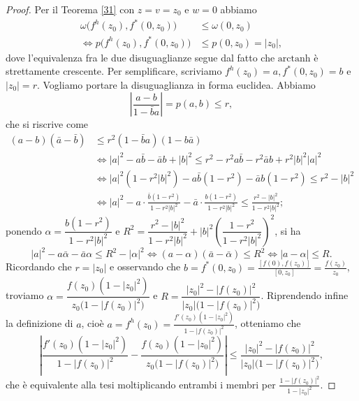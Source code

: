 \begin{proof}
  Per il Teorema \ref{31} con $z=v=z_0$ e $w=0$ abbiamo
  \begin{align*}
    \omega\bigl(f^h(z_0),f^*(0,z_0)\bigr) & \le \omega(0,z_0) \\
    \iff p\bigl(f^h(z_0),f^*(0,z_0)\bigr) & \le p(0,z_0)=|z_0|,
  \end{align*}
  dove l'equivalenza fra le due disuguaglianze segue dal fatto che $\text{arctanh}$ è strettamente crescente. Per semplificare, scriviamo $f^h(z_0)=a, f^*(0,z_0)=b$ e $|z_0|=r$. Vogliamo portare la disuguaglianza in forma euclidea. Abbiamo
  $$\left|\frac{a-b}{1-\bar{b}a}\right|=p(a,b) \le r,$$
  che si riscrive come
  \begin{align*}
    (a-b)(\bar{a}-\bar{b}) & \le r^2(1-\bar{b}a)(1-b\bar{a}) \\
    & \iff |a|^2-a\bar{b}-\bar{a}b+|b|^2 \le r^2-r^2a\bar{b}-r^2\bar{a}b+r^2|b|^2|a|^2 \\
    & \iff |a|^2(1-r^2|b|^2)-a\bar{b}(1-r^2)-\bar{a}b(1-r^2) \le r^2-|b|^2 \\
    & \iff |a|^2-a\cdot\frac{\bar{b}(1-r^2)}{1-r^2|b|^2}-\bar{a}\cdot\frac{b(1-r^2)}{1-r^2|b|^2} \le \frac{r^2-|b|^2}{1-r^2|b|^2};
  \end{align*}
  ponendo $\alpha=\dfrac{b(1-r^2)}{1-r^2|b|^2}$ e $R^2=\dfrac{r^2-|b|^2}{1-r^2|b|^2}+|b|^2\left(\dfrac{1-r^2}{1-r^2|b|^2}\right)^2$, si ha
  $$|a|^2-a\bar{\alpha}-\bar{a}\alpha \le R^2-|\alpha|^2 \iff (a-\alpha)(\bar{a}-\bar{\alpha}) \le R^2\iff |a-\alpha| \le R.$$
  Ricordando che $r=|z_0|$ e osservando che $b=f^*(0,z_0)=\frac{[f(0),f(z_0)]}{[0,z_0]}=\frac{f(z_0)}{z_0}$, troviamo $\alpha=\dfrac{f(z_0)(1-|z_0|^2)}{z_0\bigl(1-|f(z_0)|^2\bigr)}$ e $R=\dfrac{|z_0|^2-|f(z_0)|^2}{|z_0|\bigl(1-|f(z_0)|^2\bigr)}$.
  Riprendendo infine la definizione di $a$, cioè $a=f^h(z_0)=\frac{f'(z_0)(1-|z_0|^2)}{1-|f(z_0)|^2}$, otteniamo che
  $$\left|\frac{f'(z_0)(1-|z_0|^2)}{1-|f(z_0)|^2}-\frac{f(z_0)(1-|z_0|^2)}{z_0\bigl(1-|f(z_0)|^2\bigr)}\right| \le \frac{|z_0|^2-|f(z_0)|^2}{|z_0|\bigl(1-|f(z_0)|^2\bigr)},$$
  che è equivalente alla tesi moltiplicando entrambi i membri per $\frac{1-|f(z_0)|^2}{1-|z_0|^2}$.
\end{proof}
